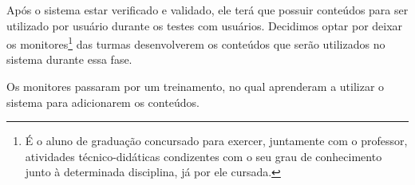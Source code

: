 Após o sistema estar verificado e validado, ele terá que possuir conteúdos para ser utilizado por usu\'ario durante os testes com 
usu\'arios. Decidimos optar por deixar os monitores\footnote{É o aluno de graduação concursado para exercer, 
juntamente com o professor, atividades técnico-didáticas condizentes com o seu grau de conhecimento junto à determinada disciplina, já por 
ele cursada.} das turmas desenvolverem os conteúdos que ser\~ao utilizados no sistema durante essa fase. 

Os monitores passaram por um treinamento, no qual aprenderam a utilizar o sistema para adicionarem os conteúdos.